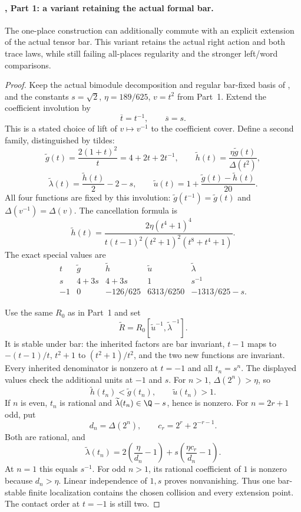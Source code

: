 \paragraph{, Part 1: a variant retaining the actual formal bar.}
The one-place construction can additionally commute with
an explicit extension of the actual tensor bar.
This variant retains the actual right action and both
trace laws, while still failing all-places regularity
and the stronger left/word comparisons.

\begin{proof}
Keep the actual bimodule decomposition and regular
bar-fixed basis of , and the constants
$s=\sqrt2$, $\eta=189/625$, $v=t^2$ from Part~1.
Extend the coefficient involution by
\[
 \overline t=t^{-1},\qquad \overline s=s.
\]
This is a stated choice of lift of $v\mapsto v^{-1}$
to the coefficient cover.
Define a second family, distinguished by tildes:
\[
 \widetilde g(t)=\frac{2(1+t)^2}{t}
                  =4+2t+2t^{-1},\qquad
 \widetilde h(t)=\frac{\eta\widetilde g(t)}{\Delta(t^2)},
\]
\begin{equation}\label{eq:barfractionalfunctions}
 \widetilde\lambda(t)=\frac{\widetilde h(t)}2-2-s,\qquad
 \widetilde u(t)=1+\frac{\widetilde g(t)-\widetilde h(t)}{20}.
\end{equation}
All four functions are fixed by this involution:
$\widetilde g(t^{-1})=\widetilde g(t)$ and
$\Delta(v^{-1})=\Delta(v)$.
The cancellation formula is
\[
 \widetilde h(t)=
 \frac{2\eta(t^4+1)^4}
 {t(t-1)^2(t^2+1)^2(t^8+t^4+1)}.
\]
The exact special values are
\[
\begin{array}{c|cccc}
t&\widetilde g&\widetilde h&\widetilde u&
                                   \widetilde\lambda\\ \hline
s&4+3s&4+3s&1&s^{-1}\\
-1&0&-126/625&6313/6250&-1313/625-s .
\end{array}
\]

Use the same $R_0$ as in Part~1 and set
\[
 \widetilde R
   =R_0[\widetilde u^{-1},\widetilde\lambda^{-1}].
\]
It is stable under bar: the inherited factors are
bar invariant, $t-1$ maps to $-(t-1)/t$,
$t^2+1$ to $(t^2+1)/t^2$, and the two new functions
are invariant.
Every inherited denominator is nonzero at $t=-1$
and all $t_n=s^n$.
The displayed values check the additional units
at $-1$ and $s$.
For $n>1$, $\Delta(2^n)>\eta$, so
\[
 \widetilde h(t_n)<\widetilde g(t_n),\qquad
 \widetilde u(t_n)>1.
\]
If $n$ is even, $t_n$ is rational and
$\widetilde\lambda(t_n)\in\Q-s$, hence is nonzero.
For $n=2r+1$ odd, put
\[
 d_n=\Delta(2^n),\qquad c_r=2^r+2^{-r-1}.
\]
Both are rational, and
\[
 \widetilde\lambda(t_n)
 =2\left(\frac{\eta}{d_n}-1\right)
   +s\left(\frac{\eta c_r}{d_n}-1\right).
\]
At $n=1$ this equals $s^{-1}$.
For odd $n>1$, its rational coefficient of $1$
is nonzero because $d_n>\eta$.
Linear independence of $1,s$ proves nonvanishing.
Thus one bar-stable finite localization contains the
chosen collision and every extension point.
The contact order at $t=-1$ is still two.


\end{proof}
